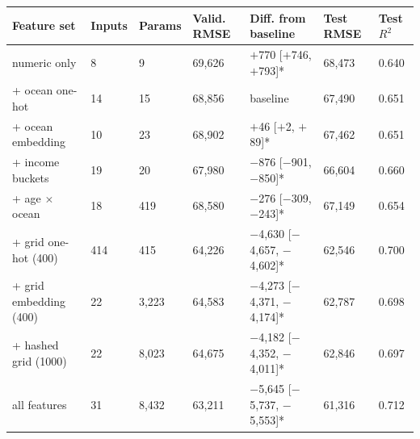 \begin{tabular}{L{3.9cm}R{1.0cm}R{1.2cm}R{1.3cm}L{4.0cm}R{1.3cm}R{1.0cm}}
\toprule
Feature set & Inputs & Params & Valid. RMSE & Diff. from baseline\newline [95\% interval] & Test RMSE & Test $R^2$ \\
\midrule
numeric only & 8 & 9 & 69,626 & $+$770 [$+$746, $+$793]* & 68,473 & 0.640 \\
+ ocean one-hot & 14 & 15 & 68,856 & baseline & 67,490 & 0.651 \\
+ ocean embedding & 10 & 23 & 68,902 & $+$46 [$+$2, $+$89]* & 67,462 & 0.651 \\
+ income buckets & 19 & 20 & 67,980 & $-$876 [$-$901, $-$850]* & 66,604 & 0.660 \\
+ age $\times$ ocean & 18 & 419 & 68,580 & $-$276 [$-$309, $-$243]* & 67,149 & 0.654 \\
+ grid one-hot (400) & 414 & 415 & 64,226 & $-$4,630 [$-$4,657, $-$4,602]* & 62,546 & 0.700 \\
+ grid embedding (400) & 22 & 3,223 & 64,583 & $-$4,273 [$-$4,371, $-$4,174]* & 62,787 & 0.698 \\
+ hashed grid (1000) & 22 & 8,023 & 64,675 & $-$4,182 [$-$4,352, $-$4,011]* & 62,846 & 0.697 \\
all features & 31 & 8,432 & 63,211 & $-$5,645 [$-$5,737, $-$5,553]* & 61,316 & 0.712 \\
\bottomrule
\end{tabular}
